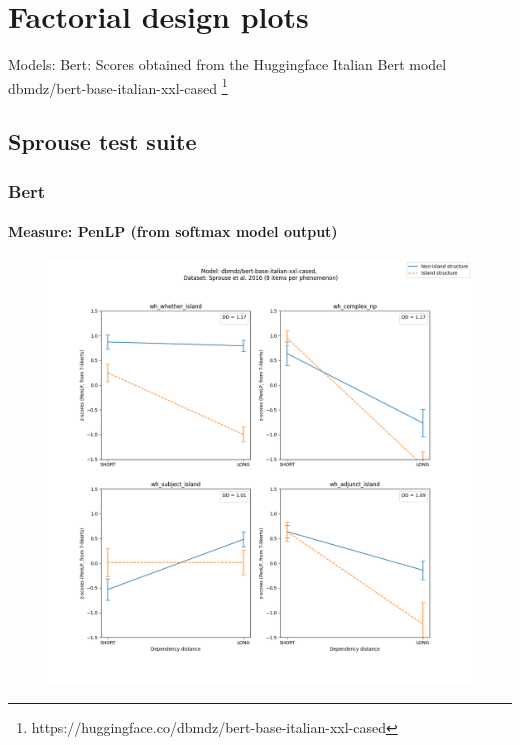\chapter{Factorial design plots}

Models:
Bert: Scores obtained from the Huggingface Italian Bert model dbmdz/bert-base-italian-xxl-cased \footnote{https://huggingface.co/dbmdz/bert-base-italian-xxl-cased}

\clearpage
\section{Sprouse test suite}
\subsection{Bert}
\subsubsection{Measure: PenLP (from softmax model output)}
\begin{figure}[h]
	\centering
	\includegraphics[width=1\textwidth]{images/Chapter1/Sprouse_wh_dbmdz_bert-base-italian-xxl-cased_PenLP-zscores-likert-2022-07-11.png} 
\end{figure}

\clearpage
